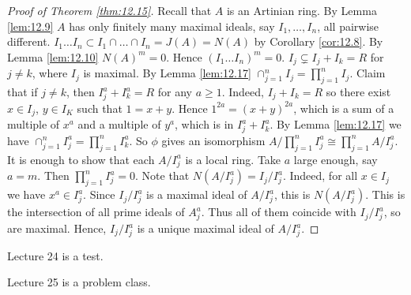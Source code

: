 \documentclass{article}
\newcommand{\rb}[1]{\left( #1 \right)}
\theoremstyle{definition}\newtheorem{definition}{Definition}[section]
\theoremstyle{definition}\newtheorem{remark}[definition]{Remark}
\theoremstyle{definition}\newtheorem*{example}{Example}
\theoremstyle{definition}\newtheorem*{note}{Note}
\begin{document}
\begin{proof}[Proof of Theorem \ref{thm:12.15}]
Recall that $ A $ is an Artinian ring. By Lemma \ref{lem:12.9} $ A $ has only finitely many maximal ideals, say $ I_1, \dots, I_n $, all pairwise different. $ I_1 \dots I_n \subset I_1 \cap \dots \cap I_n = J\rb{A} = N\rb{A} $ by Corollary \ref{cor:12.8}. By Lemma \ref{lem:12.10} $ N\rb{A}^m = 0 $. Hence $ \rb{I_1 \dots I_n}^m = 0 $. $ I_j \subsetneq I_j + I_k = R $ for $ j \ne k $, where $ I_j $ is maximal. By Lemma \ref{lem:12.17} $ \cap_{j = 1}^n I_j = \prod_{j = 1}^n I_j $. Claim that if $ j \ne k $, then $ I_j^a + I_k^a = R $ for any $ a \ge 1 $. Indeed, $ I_j + I_k = R $ so there exist $ x \in I_j $, $ y \in I_K $ such that $ 1 = x + y $. Hence $ 1^{2a} = \rb{x + y}^{2a} $, which is a sum of a multiple of $ x^a $ and a multiple of $ y^a $, which is in $ I_j^a + I_k^a $. By Lemma \ref{lem:12.17} we have $ \cap_{j = 1}^n I_j^a = \prod_{j = 1}^n I_k^a $. So $ \phi $ gives an isomorphism $ A / \prod_{j = 1}^n I_j^a \cong \prod_{j = 1}^n A / I_j^a $. It is enough to show that each $ A / I_j^a $ is a local ring. Take $ a $ large enough, say $ a = m $. Then $ \prod_{j = 1}^n I_j^a = 0 $. Note that $ N\rb{A / I_j^a} = I_j / I_j^a $. Indeed, for all $ x \in I_j $ we have $ x^a \in I_j^a $. Since $ I_j / I_j^a $ is a maximal ideal of $ A / I_j^a $, this is $ N\rb{A / I_j^a} $. This is the intersection of all prime ideals of $ A_j^a $. Thus all of them coincide with $ I_j / I_j^a $, so are maximal. Hence, $ I_j / I_j^a $ is a unique maximal ideal of $ A / I_j^a $.
\end{proof}


Lecture 24 is a test.


Lecture 25 is a problem class.
\end{document}
